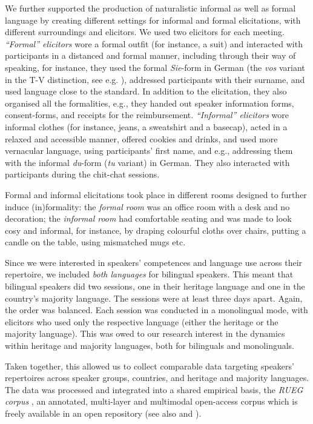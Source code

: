 \documentclass[output=paper,colorlinks,citecolor=brown]{langscibook}
\begin{document}
We further supported the production of naturalistic informal as well as formal language by creating different settings for informal and formal elicitations, with different surroundings and elicitors. We used two elicitors for each meeting. \textit{“Formal” elicitors} wore a formal outfit (for instance, a suit) and interacted with participants in a distanced and formal manner, including through their way of speaking, for instance, they used the formal \emph{Sie}-form in German (the \emph{vos} variant in the T-V distinction, see e.g. \cite{bilaetal2020}), addressed participants with their surname, and used language close to the standard. In addition to the elicitation, they also organised all the formalities, e.g., they handed out speaker information forms, consent-forms, and receipts for the reimbursement. \textit{“Informal” elicitors} wore informal clothes (for instance, jeans, a sweatshirt and a basecap), acted in a relaxed and accessible manner, offered cookies and drinks, and used more vernacular language, using participants’ first name, and e.g., addressing them with the informal \emph{du}-form (\emph{tu} variant) in German. They also interacted with participants during the chit-chat sessions.

Formal and informal elicitations took place in different rooms designed to further induce (in)formality: the \textit{formal room} was an office room with a desk and no decoration; the \textit{informal room} had comfortable seating and was made to look cosy and informal, for instance, by draping colourful cloths over chairs, putting a candle on the table, using mismatched mugs etc.

Since we were interested in speakers’ competences and language use across their repertoire, we included \textit{both languages} for bilingual speakers. This meant that bilingual speakers did two sessions, one in their heritage language and one in the country’s majority language. The sessions were at least three days apart. Again, the order was balanced. Each session was conducted in a monolingual mode, with elicitors who used only the respective language (either the heritage or the majority language). This was owed to our research interest in the dynamics within heritage and majority languages, both for bilinguals and monolinguals.

Taken together, this allowed us to collect comparable data targeting speakers’ repertoires across speaker groups, countries, and heritage and majority languages. The data was processed and integrated into a shared empirical basis, the \textit{RUEG corpus} \parencite{RUEGcorpus2024}, an annotated, multi-layer and multimodal open-access corpus which is freely available in an open repository (see also \cite{chapters/03} and \cite{Klotzetal2024}).
\end{document}
